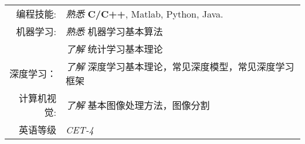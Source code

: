 %
%


 
\renewcommand{\arraystretch}{1.1}

	\begin{tabular}{>{}r>{}p{13cm}} 
		\textsc{编程技能:}      &  \emph{熟悉} \quad \textbf{C/C++}, Matlab, Python, Java.\\  
		\textsc{机器学习:} 		&  \emph{熟悉} \quad  机器学习基本算法 \\
							    &  \emph{了解} \quad  统计学习基本理论 \\
	    \textsc{深度学习：}     &  \emph{了解} \quad 深度学习基本理论，常见深度模型，常见深度学习框架 \\
		\textsc{计算机视觉:}    &  \emph{了解} \quad  基本图像处理方法，图像分割  \\
		\textsc{英语等级}	    &  \textit{CET-4}\\
	\end{tabular}
	

